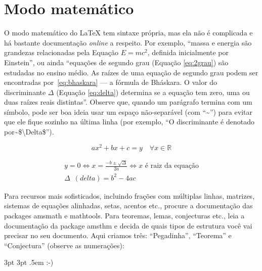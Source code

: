 \section{Modo matemático}

O modo matemático do \LaTeX{} tem sintaxe própria, mas ela não é complicada e
há bastante documentação \emph{online} a respeito. Por exemplo, ``massa e
energia são grandezas relacionadas pela Equação $E=mc^2$, definida inicialmente
por Einstein'', ou ainda ``equações de segundo grau (Equação \ref{eq:2grau})
são estudadas no ensino médio. As raízes de uma equação de segundo grau podem
ser encontradas por~\eqref{eq:bhaskara} --- a fórmula de Bháskara.
O valor do discriminante $\Delta$ (Equação \ref{eq:delta}) determina se a
equação tem zero, uma ou duas raízes reais distintas''. Observe que, quando um
parágrafo termina com um símbolo, pode ser boa ideia usar um espaço
não-separável (com ``\textsf{\textasciitilde}'') para evitar que ele
fique sozinho na última linha (por exemplo, ``\textsf{O discriminante é
denotado por\textasciitilde{}\$\textbackslash{}Delta\$}'').\label{orphanchar}

\begin{equation}
  \label{eq:2grau}
  ax^2+bx+c=y \quad \forall x \in \mathbb{R}
\end{equation}

\begin{gather}
  \label{eq:bhaskara}
    y=0 \Leftrightarrow x=\frac{-b \pm \sqrt{\Delta}}{2a}
    \Leftrightarrow x \text{ é raiz da equação}\\
  \label{eq:delta}
    \Delta\enspace(\mathit{delta}) = b^2-4ac
\end{gather}

Para recursos mais sofisticados, incluindo frações com múltiplas linhas,
matrizes, sistemas de equações alinhadas, setas, acentos etc., procure
a documentação das packages \textsf{amsmath} e \textsf{mathtools}. Para
teoremas, lemas, conjecturas etc., leia a documentação da package
\textsf{amsthm} e decida de quais tipos de estrutura você vai precisar
no seu documento. Aqui criamos três: ``Pegadinha'', ``Teorema'' e
``Conjectura'' (observe as numerações):

{3pt} %
{3pt} %
{\itshape} %
{} %
{\bfseries} %
{} %
{.5em} %
{ :-)\space} %

